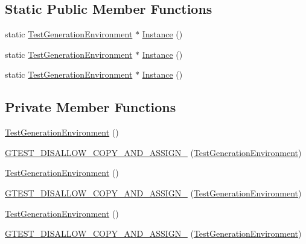 \subsection*{Static Public Member Functions}
\begin{DoxyCompactItemize}
\item 
static \mbox{\hyperlink{class_test_generation_environment}{Test\+Generation\+Environment}} $\ast$ \mbox{\hyperlink{class_test_generation_environment_a5b8e14f430fe11d558c0e4482cebd694}{Instance}} ()
\item 
static \mbox{\hyperlink{class_test_generation_environment}{Test\+Generation\+Environment}} $\ast$ \mbox{\hyperlink{class_test_generation_environment_a5b8e14f430fe11d558c0e4482cebd694}{Instance}} ()
\item 
static \mbox{\hyperlink{class_test_generation_environment}{Test\+Generation\+Environment}} $\ast$ \mbox{\hyperlink{class_test_generation_environment_a5b8e14f430fe11d558c0e4482cebd694}{Instance}} ()
\end{DoxyCompactItemize}
\subsection*{Private Member Functions}
\begin{DoxyCompactItemize}
\item 
\mbox{\hyperlink{class_test_generation_environment_acd170900a12de9e9e374366032230301}{Test\+Generation\+Environment}} ()
\item 
\mbox{\hyperlink{class_test_generation_environment_a995321b3007e0b271b14b238dd3cb9bd}{G\+T\+E\+S\+T\+\_\+\+D\+I\+S\+A\+L\+L\+O\+W\+\_\+\+C\+O\+P\+Y\+\_\+\+A\+N\+D\+\_\+\+A\+S\+S\+I\+G\+N\+\_\+}} (\mbox{\hyperlink{class_test_generation_environment}{Test\+Generation\+Environment}})
\item 
\mbox{\hyperlink{class_test_generation_environment_acd170900a12de9e9e374366032230301}{Test\+Generation\+Environment}} ()
\item 
\mbox{\hyperlink{class_test_generation_environment_a995321b3007e0b271b14b238dd3cb9bd}{G\+T\+E\+S\+T\+\_\+\+D\+I\+S\+A\+L\+L\+O\+W\+\_\+\+C\+O\+P\+Y\+\_\+\+A\+N\+D\+\_\+\+A\+S\+S\+I\+G\+N\+\_\+}} (\mbox{\hyperlink{class_test_generation_environment}{Test\+Generation\+Environment}})
\item 
\mbox{\hyperlink{class_test_generation_environment_acd170900a12de9e9e374366032230301}{Test\+Generation\+Environment}} ()
\item 
\mbox{\hyperlink{class_test_generation_environment_a995321b3007e0b271b14b238dd3cb9bd}{G\+T\+E\+S\+T\+\_\+\+D\+I\+S\+A\+L\+L\+O\+W\+\_\+\+C\+O\+P\+Y\+\_\+\+A\+N\+D\+\_\+\+A\+S\+S\+I\+G\+N\+\_\+}} (\mbox{\hyperlink{class_test_generation_environment}{Test\+Generation\+Environment}})
\end{DoxyCompactItemize}
